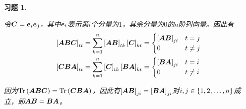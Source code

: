 \documentclass{ctexart}
\newtheorem{problem}{习题}[section]
\begin{document}
\begin{problem}\


令\(\matc=\vece_i\vece_j\)，其中\(\vece_i\)表示第\(i\)个分量为\(1\)，其余分量为\(0\)的\(n\)阶列向量。因此有
\begin{align*}
    \mat{\mata\matb\matc}_{tt} & =\sum_{k=1}^n\mat{\mata\matb}_{tk}\mat{\matc}_{kt}=
    \begin{cases}
        \mat{\mata\matb}_{ji} & t=j     \\
        0                     & t\neq j
    \end{cases}                                                  \\
    \mat{\matc\matb\mata}_{tt} & =\sum_{k=1}^n\mat{\matc}_{tk}\mat{\matb\mata}_{kt}=
    \begin{cases}
        \mat{\matb\mata}_{ji} & t=i     \\
        0                     & t\neq i
    \end{cases}
\end{align*}

因为\(\trace{\mata\matb\matc}=\trace{\matc\matb\mata}\)，因此有\(\mat{\mata\matb}_{ji}=\mat{\matb\mata}_{ji}\)对\(i,j\in\setof{1,2,\dots,n}\)成立，即\(\mata\matb=\matb\mata\)。

\end{problem}
\end{document}
